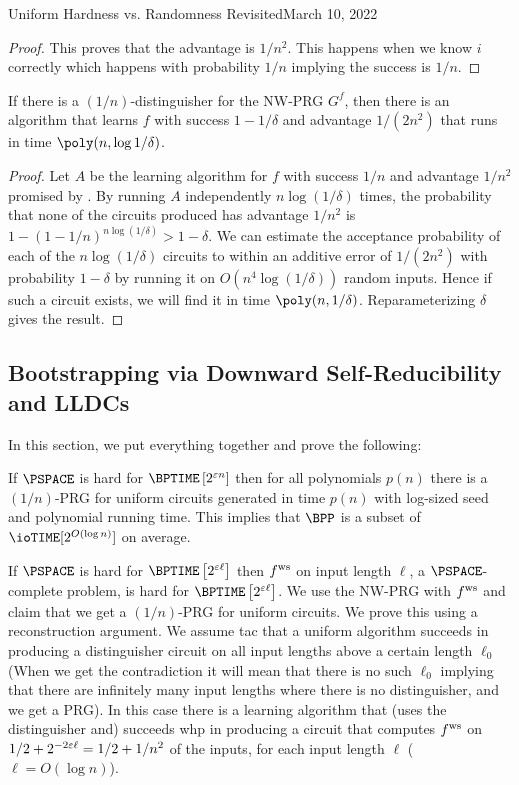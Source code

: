 \begin{lecture}{8}{Uniform Hardness vs. Randomness Revisited}{March 10, 2022}
\begin{proof}
This proves that the advantage is $1/n^2$. This happens when we know $i$ correctly which happens with probability $1/n$ implying the success is $1/n$.	
\end{proof}


\begin{corollary}\label{cor:learning-boost-success}
	If there is a $(1/n)$-distinguisher for the NW-PRG $G^f$, then there is an
	algorithm that learns $f$ with success $1 - 1/\delta$ and advantage
	$1/(2n^2)$ that runs in time $\poly(n, \log{1/\delta})$.
\end{corollary}

\begin{proof}
	Let $A$ be the learning algorithm for $f$ with success $1/n$ and advantage
	$1/n^2$ promised by . By running $A$
	independently $n \log(1/\delta)$ times, the probability that none of the
	circuits produced has advantage $1/n^2$ is $1 - (1 - 1/n)^{n\log(1/\delta)} >
	1 - \delta$. We can estimate the acceptance probability of each of the
	$n\log(1/\delta)$ circuits to within an additive error of $1/(2n^2)$ with
	probability $1 - \delta$ by running it on $O(n^4 \log(1/\delta))$ random
	inputs. Hence if such a circuit exists, we will find it in time $\poly(n,
	1/\delta)$. Reparameterizing $\delta$ gives the result.
\end{proof}


\subsection{Bootstrapping via Downward Self-Reducibility and LLDCs}
In this section, we put everything together and prove the following:
\begin{theorem}
	If $\PSPACE$ is hard for $\BPTIME\left[2^{\eps n}\right]$ then for all polynomials $p(n)$ there is a $(1/n)$-PRG for uniform circuits generated in time $p(n)$ with log-sized seed and polynomial running time. This implies that $\BPP$ is a subset of $\ioTIME[2^{O(\log n)}]$ on average.
\end{theorem}


If $\PSPACE$ is hard for $\BPTIME\left[2^{\eps \ell}\right]$ then $ f^{\text{ws}} $ on input length $\ell$, a $\PSPACE$-complete problem, is hard for $\BPTIME\left[2^{\eps \ell}\right]$. 
We use the NW-PRG with $ f^{\text{ws}} $ and claim that we get a $(1/n)$-PRG for uniform circuits. We prove this using a reconstruction argument. 
We assume tac that a uniform algorithm succeeds in producing a distinguisher circuit on all input lengths above a certain length $\ell_0$ (When we get the contradiction it will mean that there is no such $\ell_0$ implying that there are infinitely many input lengths where there is no distinguisher, and we get a PRG). In this case there is a learning algorithm that (uses the distinguisher and) succeeds whp in producing a circuit that computes $ f^{\text{ws}} $ on $1/2+2^{-2\varepsilon \ell} = 1/2+1/n^2$ of the inputs, for each input length $\ell$ ($\ell=O(\log n )$). 


\end{lecture}

